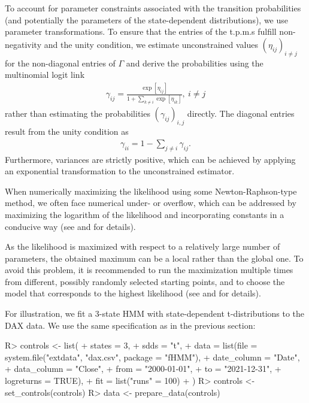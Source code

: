 \documentclass[article]{jss}
\begin{document}
To account for parameter constraints associated with the transition probabilities (and potentially the parameters of the state-dependent distributions), we use parameter transformations. To ensure that the entries of the t.p.m.s fulfill non-negativity and the unity condition, we estimate unconstrained values $(\eta_{ij})_{i\neq j}$ for the non-diagonal entries of $\Gamma$ and derive the probabilities using the multinomial logit link
\begin{align*}
\gamma_{ij}=\frac{\exp[\eta_{ij}]}{1+\sum_{k\neq i}\exp[\eta_{ik}]},~i\neq j
\end{align*}
rather than estimating the probabilities $(\gamma_{ij})_{i,j}$ directly. The diagonal entries result from the unity condition as
\begin{align*}
\gamma_{ii}=1-\sum_{j\neq i}\gamma_{ij}.
\end{align*}
Furthermore, variances are strictly positive, which can be achieved by applying an exponential transformation to the unconstrained estimator.

When numerically maximizing the likelihood using some Newton-Raphson-type method, we often face numerical under- or overflow, which can be addressed by maximizing the logarithm of the likelihood and incorporating constants in a conducive way (see \cite{zuc16} and \cite{oel21} for details).

As the likelihood is maximized with respect to a relatively large number of parameters, the obtained maximum can be a local rather than the global one. To avoid this problem, it is recommended to run the maximization multiple times from different, possibly randomly selected starting points, and to choose the model that corresponds to the highest likelihood (see \cite{zuc16} and \cite{oel21} for details).

For illustration, we fit a 3-state HMM with state-dependent t-distributions to the DAX data. We use the same specification as in the previous section:

%
\begin{Schunk}
\begin{Sinput}
R> controls <- list(
+    states = 3,
+    sdds   = "t",
+    data   = list(file        = system.file("extdata", "dax.csv", package = "fHMM"),
+                  date_column = "Date",
+                  data_column = "Close",
+                  from        = "2000-01-01",
+                  to          = "2021-12-31",
+                  logreturns  = TRUE),
+    fit    = list("runs" = 100)
+  )
R> controls <- set_controls(controls)
R> data <- prepare_data(controls)
\end{Sinput}
\end{Schunk}
%
\end{document}

